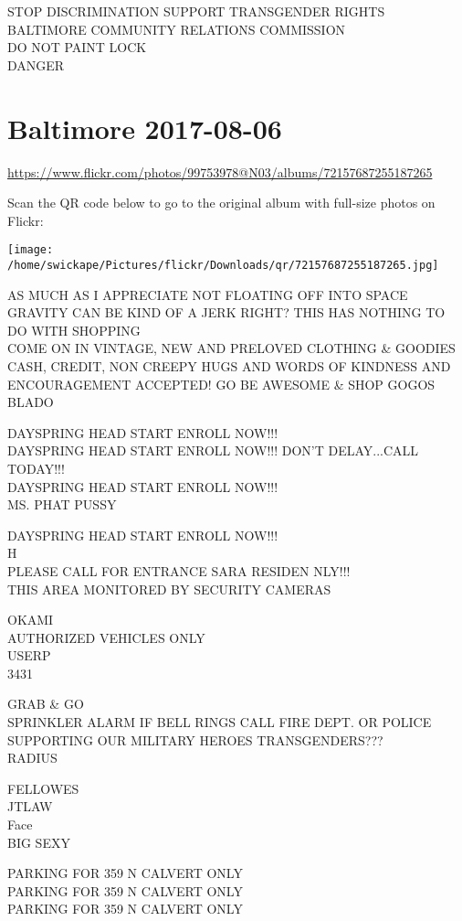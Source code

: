 \documentclass[10pt,letterpaper]{article}
\begin{document}
STOP DISCRIMINATION SUPPORT TRANSGENDER RIGHTS BALTIMORE COMMUNITY RELATIONS COMMISSION\\
DO NOT PAINT LOCK\\
DANGER
\pagebreak

\section*{Baltimore 2017-08-06}

\url{https://www.flickr.com/photos/99753978@N03/albums/72157687255187265}

Scan the QR code below to go to the original album with full-size photos on Flickr:

\texttt{[image: /home/swickape/Pictures/flickr/Downloads/qr/72157687255187265.jpg]}
\pagebreak

AS MUCH AS I APPRECIATE NOT FLOATING OFF INTO SPACE GRAVITY CAN BE KIND OF A JERK RIGHT?  THIS HAS NOTHING TO DO WITH SHOPPING\\
COME ON IN VINTAGE, NEW AND PRELOVED CLOTHING \& GOODIES CASH, CREDIT, NON CREEPY HUGS AND WORDS OF KINDNESS AND ENCOURAGEMENT ACCEPTED!  GO BE AWESOME \& SHOP GOGOS\\
BLADO

DAYSPRING HEAD START ENROLL NOW!!!\\
DAYSPRING HEAD START ENROLL NOW!!!  DON'T DELAY...CALL TODAY!!!\\
DAYSPRING HEAD START ENROLL NOW!!!\\
MS. PHAT PUSSY

DAYSPRING HEAD START ENROLL NOW!!!\\
H\\
PLEASE CALL FOR ENTRANCE SARA RESIDEN NLY!!!\\
THIS AREA MONITORED BY SECURITY CAMERAS

OKAMI\\
AUTHORIZED VEHICLES ONLY\\
USERP\\
3431

GRAB \& GO\\
SPRINKLER ALARM IF BELL RINGS CALL FIRE DEPT. OR POLICE\\
SUPPORTING OUR MILITARY HEROES TRANSGENDERS???\\
RADIUS

FELLOWES\\
JTLAW\\
Face\\
BIG SEXY

PARKING FOR 359 N CALVERT ONLY\\
PARKING FOR 359 N CALVERT ONLY\\
PARKING FOR 359 N CALVERT ONLY
\end{document}
